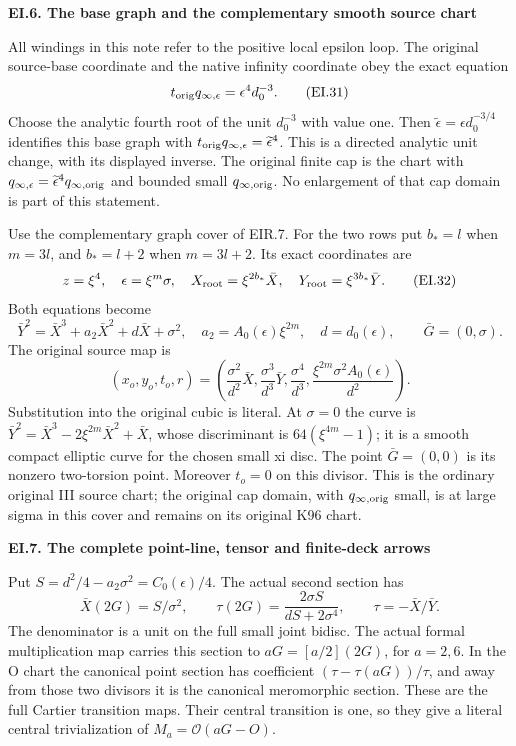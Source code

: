 \medskip\noindent\textbf{EI.6. The base graph and the complementary smooth source chart}

\par\nobreak

All windings in this note refer to the positive local epsilon loop.
The original source-base coordinate and the native infinity coordinate
obey the exact equation
\[
 t_{\rm orig}q_{\infty,\epsilon}=\epsilon^4d_0^{-3}.
 \tag{EI.31}
\]
Choose the analytic fourth root of the unit \(d_0^{-3}\) with value one.
Then \(\widetilde\epsilon=\epsilon d_0^{-3/4}\) identifies this base
graph with \(t_{\rm orig}q_{\infty,\epsilon}=\widetilde\epsilon^4\).
This is a directed analytic unit change, with its displayed inverse.
The original finite cap is the chart with
\(q_{\infty,\epsilon}=\widetilde\epsilon^4q_{\infty,\rm orig}\)
and bounded small \(q_{\infty,\rm orig}\). No enlargement of that cap
domain is part of this statement.

Use the complementary graph cover of EIR.7. For the two rows put
\(b_*=l\) when \(m=3l\), and \(b_*=l+2\) when \(m=3l+2\).
Its exact coordinates are
\[
 z=\xi^4,\quad \epsilon=\xi^m\sigma,\quad
 X_{\rm root}=\xi^{2b_*}\bar X,\quad
 Y_{\rm root}=\xi^{3b_*}\bar Y.
 \tag{EI.32}
\]
Both equations become
\[
 \bar Y^2=\bar X^3+a_2\bar X^2+d\bar X+\sigma^2,
 \quad a_2=A_0(\epsilon)\xi^{2m},\quad d=d_0(\epsilon),
 \qquad \bar G=(0,\sigma).
 \tag{EI.33}
\]
The original source map is
\[
 (x_o,y_o,t_o,r)=
 \left(\frac{\sigma^2}{d^2}\bar X,
       \frac{\sigma^3}{d^3}\bar Y,
       \frac{\sigma^4}{d^3},
       \frac{\xi^{2m}\sigma^2A_0(\epsilon)}{d^2}\right).
 \tag{EI.34}
\]
Substitution into the original cubic is literal. At \(\sigma=0\)
the curve is
\(\bar Y^2=\bar X^3-2\xi^{2m}\bar X^2+\bar X\), whose
discriminant is \(64(\xi^{4m}-1)\); it is a smooth compact elliptic
curve for the chosen small xi disc. The point \(\bar G=(0,0)\)
is its nonzero two-torsion point. Moreover \(t_o=0\) on this
divisor. This is the ordinary original III source chart; the original
cap domain, with \(q_{\infty,\rm orig}\) small, is at large sigma
in this cover and remains on its original K96 chart.

\par

\medskip\noindent\textbf{EI.7. The complete point-line, tensor and finite-deck arrows}

\par\nobreak

Put \(S=d^2/4-a_2\sigma^2=C_0(\epsilon)/4\). The actual second
section has
\[
 \bar X(2G)=S/\sigma^2,\qquad
 \tau(2G)=\frac{2\sigma S}{dS+2\sigma^4},\qquad
 \tau=-\bar X/\bar Y.
 \tag{EI.35}
\]
The denominator is a unit on the full small joint bidisc. The actual
formal multiplication map carries this section to
\(aG=[a/2](2G)\), for \(a=2,6\). In the O chart the canonical
point section has coefficient
\((\tau-\tau(aG))/\tau\), and away from those two divisors it
is the canonical meromorphic section. These are the full Cartier
transition maps. Their central transition is one, so they give a
literal central trivialization of \(M_a=\mathcal O(aG-O)\).


